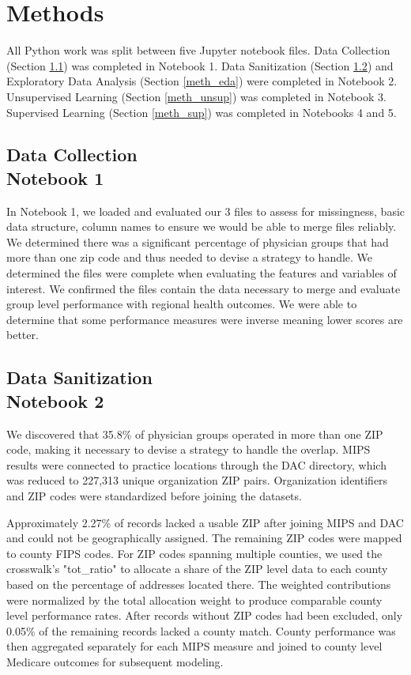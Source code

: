 \documentclass[12pt]{article}
\begin{document}
\newpage

\section{Methods}
All Python work was split between five Jupyter notebook files. Data Collection (Section \ref{meth_collect}) was completed in Notebook 1. Data Sanitization (Section \ref{meth_sanitize}) and Exploratory Data Analysis (Section \ref{meth_eda}) were completed in Notebook 2. Unsupervised Learning (Section \ref{meth_unsup}) was completed in Notebook 3. Supervised Learning (Section \ref{meth_sup}) was completed in Notebooks 4 and 5.

\subsection[Data Collection]{Data Collection \\ \small{Notebook 1}} \label{meth_collect}
In Notebook 1, we loaded and evaluated our 3 files to assess for missingness, basic data structure, column names to ensure we would be able to merge files reliably. We determined there was a significant percentage of physician groups that had more than one zip code and thus needed to devise a strategy to handle. We determined the files were complete when evaluating the features and variables of interest. We confirmed the files contain the data necessary to merge and evaluate group level performance with regional health outcomes. We were able to determine that some performance measures were inverse meaning lower scores are better.

\subsection[Data Sanitization]{Data Sanitization \\ \small{Notebook 2}} \label{meth_sanitize}
We discovered that 35.8\% of physician groups operated in more than one ZIP code, making it necessary to devise a strategy to handle the overlap. MIPS results were connected to practice locations through the DAC directory, which was reduced to 227,313 unique organization ZIP pairs. Organization identifiers and ZIP codes were standardized before joining the datasets. 

Approximately 2.27\% of records lacked a usable ZIP after joining MIPS and DAC and could not be geographically assigned. The remaining ZIP codes were mapped to county FIPS codes. For ZIP codes spanning multiple counties, we used the crosswalk’s "tot\_ratio" to allocate a share of the ZIP level data to each county based on the percentage of addresses located there. The weighted contributions were normalized by the total allocation weight to produce comparable county level performance rates. After records without ZIP codes had been excluded, only 0.05\% of the remaining records lacked a county match. County performance was then aggregated separately for each MIPS measure and joined to county level Medicare outcomes for subsequent modeling.
\end{document}
